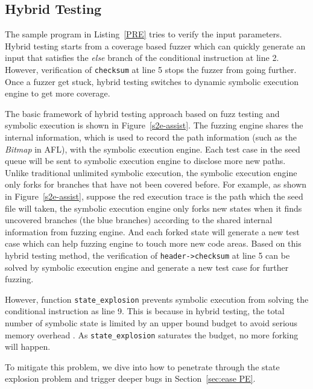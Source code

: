 \subsection{Hybrid Testing}
The sample program in Listing~\ref{PRE} tries to verify the input parameters.
 Hybrid testing starts from a coverage based fuzzer which can quickly generate an input that satisfies the \textit{else} branch of the conditional instruction at line 2.
 However, verification of \texttt{checksum} at line 5 stops the fuzzer from going further.
 Once a fuzzer get stuck, hybrid testing switches to dynamic symbolic execution engine to get more coverage.

The basic framework of hybrid testing approach based on fuzz testing and symbolic execution is shown in Figure~\ref{s2e-assist}.
 The fuzzing engine shares the internal information, which is used to record the path information (such as the \textit{Bitmap} in AFL), with the symbolic execution engine. 
 Each test case in the seed queue will be sent to symbolic execution engine to disclose more new paths. 
 Unlike traditional unlimited symbolic execution, the symbolic execution engine only forks for branches that have not been covered before.
 For example, as shown in Figure~\ref{s2e-assist}, suppose the red execution trace is the path which the seed file will taken, the symbolic execution engine only forks new states when it finds uncovered branches (the blue branches) according to the shared internal information from fuzzing engine.
 And each forked state will generate a new test case which can help fuzzing engine to touch more new code areas. 
 Based on this hybrid testing method, the verification of \texttt{header->checksum} at line 5 can be solved by symbolic execution engine and generate a new test case for further fuzzing.

However, function \texttt{state\_explosion} prevents symbolic execution from solving the conditional instruction as line 9.
 This is because in hybrid testing, the total number of symbolic state is limited by an upper bound budget to avoid serious memory overhead \cite{stephens2016driller}. 
 As \texttt{state\_explosion} saturates the budget, no more forking will happen.

To mitigate this problem, we dive into how to penetrate through the state explosion problem and trigger deeper bugs in Section~\ref{sec:ease PE}.